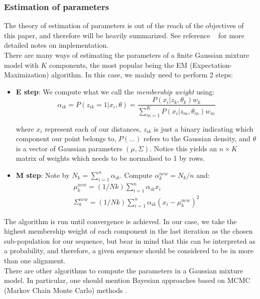 \documentclass[a4paper]{llncs}
\begin{document}
\subsubsection{Estimation of parameters}

The theory of estimation of parameters is out of the reach of the objectives of this paper, and therefore will be heavily summarized. See reference ~\cite{Bishop2006} for more detailed notes on implementation.\\

There are many ways of estimating the parameters of a finite Gaussian mixture model with $K$ components, the most popular being the EM (Expectation-Maximization) algorithm. In this case, we mainly need to perform 2 steps:

\begin{itemize}
\item \textbf{E step}: We compute what we call the \textit{membership weight} using:
\begin{equation}
\alpha_{ik} = P(z_{ik} = 1| x_i,\theta) = \dfrac{P(x_i|z_k, \theta_k)w_k}{\sum_{m=1}^{K}P(x_i|z_m, \theta_m) w_m}
\end{equation}

where $x_i$ represent each of our distances, $z_{ik}$ is just a binary indicating which component our point belongs to, $P(\dots)$ refers to the Gaussian density, and $\theta$ is a vector of Gaussian parameters $(\mu, \Sigma)$. Notice this yields an $n \times K$ matrix of weights which needs to be normalised to 1 by rows.\\
\item \textbf{M step}: Note by $N_k = \sum_{i=1}^{n} \alpha_{ik}$. Compute $\alpha_k^{new} = N_k / n$ and:
\begin{gather}
\mu_k^{new} = (1/Nk)\sum_{i=1}^n \alpha_{ik} x_i\\
\Sigma_k^{new} = (1/Nk)\sum_{i=1}^n \alpha_{ik}(x_i - \mu_k^{new})^2
\end{gather}
\end{itemize}

The algorithm is run until convergence is achieved. In our case, we take the highest membership weight of each component in the last iteration as the chosen sub-population for our sequence, but bear in mind that this can be interpreted as a probability, and therefore, a given sequence should be considered to be in more than one alignment.\\

There are other algorithms to compute the parameters in a Gaussian mixture model. In particular, one should mention Bayesian approaches based on MCMC (Markov Chain Monte Carlo) methods \cite{Gorur2010}.
\end{document}
